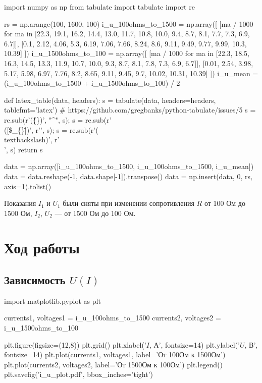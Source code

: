 \documentclass[12pt, a4paper]{article}
\begin{document}
\begin{pycode}
import numpy as np
from tabulate import tabulate
import re

rs = np.arange(100, 1600, 100)
i_u_100ohms_to_1500 = np.array([
  [ma / 1000 for ma in [22.3, 19.1, 16.2, 14.4, 13.0, 11.7, 10.8, 10.0, 9.4, 8.7, 8.1, 7.7, 7.3, 6.9, 6.7]],
  [0.1, 2.12, 4.06, 5.3, 6.19, 7.06, 7.66, 8.24, 8.6, 9.11, 9.49, 9.77, 9.99, 10.3, 10.39]
])
i_u_1500ohms_to_100 = np.array([
  [ma / 1000 for ma in [22.3, 18.5, 16.3, 14.5, 13.3, 11.9, 10.7, 10.0, 9.3, 8.7, 8.1, 7.8, 7.3, 6.9, 6.7]],
  [0.01, 2.54, 3.98, 5.17, 5.98, 6.97, 7.76, 8.2, 8.65, 9.11, 9.45, 9.7, 10.02, 10.31, 10.39]
])
i_u_mean = (i_u_100ohms_to_1500 + i_u_1500ohms_to_100) / 2

def latex_table(data, headers):
  s = tabulate(data, headers=headers, tablefmt='latex')
  # https://github.com/gregbanks/python-tabulate/issues/5
  s = re.sub(r'(\^\{\})', "^", s); s = re.sub(r'\\([\$\_\{\}\^])', r'\1', s); s = re.sub(r'(\\textbackslash{})', r'\\', s)
  return s

data = np.array([i_u_100ohms_to_1500, i_u_100ohms_to_1500, i_u_mean])
data = data.reshape(-1, data.shape[-1]).transpose()
data = np.insert(data, 0, rs, axis=1).tolist()
\end{pycode}

\begin{table}[H]
\end{table} 

Показания $I_1$ и $U_1$ были сняты при изменении сопротивления $R$ от 100 Ом
до 1500 Ом, $I_2$, $U_2$ — от 1500 Ом до 100 Ом.

\section*{Ход работы}

\subsection*{Зависимость $U(I)$}

\begin{pycode}
import matplotlib.pyplot as plt

currents1, voltages1 = i_u_100ohms_to_1500
currents2, voltages2 = i_u_1500ohms_to_100

plt.figure(figsize=(12,8))
plt.grid()
plt.xlabel('$I$, А', fontsize=14)
plt.ylabel('$U$, В', fontsize=14)
plt.plot(currents1, voltages1, label='От 100Ом к 1500Ом')
plt.plot(currents2, voltages2, label='От 1500Ом к 100Ом')
plt.legend()
plt.savefig('i_u_plot.pdf', bbox_inches='tight')
\end{pycode}
\end{document}
